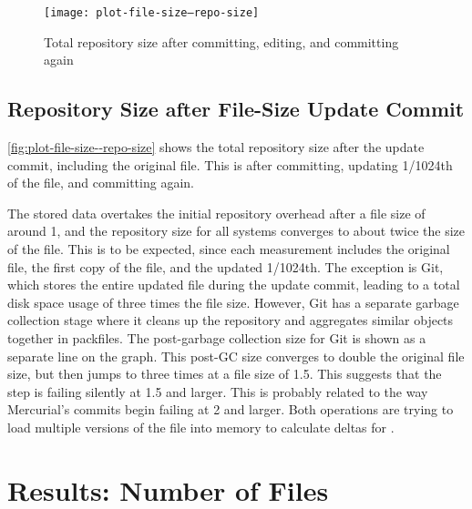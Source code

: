 %


\begin{figure}[p]
        \caption{Total repository size after committing, editing, and committing again}
        \label{fig:plot-file-size--repo-size}
        \centering

        \explaindiskspaceplot

        \texttt{[image: plot-file-size--repo-size]}
\end{figure}

\cleardoublepage

\subsection{Repository Size after File-Size Update Commit}

\autoref{fig:plot-file-size--repo-size} shows the total \gls{repository} size
after the update \gls{commit}, including the original file. This is after
committing, updating \num{1/1024}th of the file, and committing again.

The stored data overtakes the initial \gls{repository} overhead after a file
size of around \SI{1}{\mib}, and the \gls{repository} size for all systems
converges to about twice the size of the file. This is to be expected, since
each measurement includes the original file, the first copy of the file, and the
updated \num{1/1024}th. The exception is Git, which stores the entire updated
file during the update \gls{commit}, leading to a total disk space usage of
three times the file size. However, Git has a separate garbage collection stage
where it cleans up the \gls{repository} and aggregates similar objects together
in \glspl{packfile}. The post-garbage collection size for Git is shown as a
separate line on the graph. This post-GC size converges to double the original
file size, but then jumps to three times at a file size of \SI{1.5}{\gib}. This
suggests that the  step is failing silently at
\SI{1.5}{\gib} and larger. This is probably related to the way Mercurial's
\glspl{commit} begin failing at \SI{2}{\gib} and larger. Both operations are
trying to load multiple versions of the file into memory to calculate deltas for
.

%


\cleardoublepage

\section{Results: Number of Files}
\label{results-num-files}

